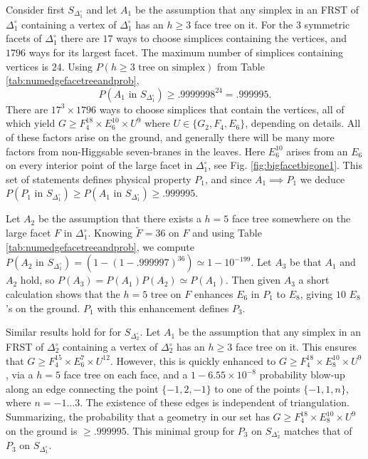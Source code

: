 \documentclass[aps,prl,twocolumn, superscriptaddress,groupedaddress,nofootinbib]{revtex4-1}
\newcommand{\sdoc}{S_{\Delta_1^\circ}}
\newcommand{\sdtc}{S_{\Delta_2^\circ}}
\newcommand{\doc}{{\Delta_1^\circ}}
\newcommand{\dtc}{{\Delta_2^\circ}}
\newcommand{\textin}{\,\, \text{in} \,\,}
\begin{document}
Consider first $\sdoc$ and let $A_1$ be the assumption that any simplex in an FRST 
of $\doc$ containing a vertex of $\doc$ has an $h\geq 3$ face tree on it. 
For the $3$ symmetric facets of $\doc$ there are $17$ ways to choose simplices
containing the vertices, and $1796$ ways for its largest facet. The maximum
number of simplices containing vertices is $24$. Using $P(h\geq 3 \,\, \text{tree on simplex})$ from Table \ref{tab:numedgefacetreeandprob},
\begin{equation}
P(A_1\textin\sdoc)\geq .9999998^{24}=.999995.
\end{equation}
There are $17^3\times1796$ ways to choose simplices that contain the vertices,
all of which yield $G\geq F_4^{18}\times E_6^{10}\times U^9$ where 
$U\in\{G_2,F_4,E_6\}$, depending on details. All of these factors arise on
the ground, and generally there will be many more factors from non-Higgsable seven-branes
in the leaves. Here $E_6^{10}$ arises from an $E_6$ on every interior point
of the large facet in $\doc$, see Fig. \ref{fig:bigfacetbigone1}. This set of
statements defines physical property $P_1$, and since $A_1\implies P_1$
we deduce $P(P_1\textin \sdoc)\geq P(A_1\textin \sdoc) \geq .999995$.

Let $A_2$ be the assumption that there exists a $h=5$ face tree somewhere
on the large facet $F$ in $\doc$. Knowing $\tilde F=36$ on $F$ and using
Table \ref{tab:numedgefacetreeandprob}, we compute $P(A_2 \textin \sdoc)=(1-(1-.999997)^{36})\simeq 1-10^{-199}.$ Let $A_3$ be that $A_1$ and $A_2$ hold, so 
$P(A_3)=P(A_1)P(A_2)\simeq P(A_1)$. Then given $A_3$ a short calculation shows 
that the  $h=5$ tree on $F$ 
enhances $E_6$ in $P_1$ to $E_8$, giving $10$ $E_8$'s on the ground. $P_1$ with this enhancement defines $P_3$. 

Similar results hold for for $\sdtc$. Let $A_1$ be the assumption that any simplex in an FRST 
of $\dtc$ containing a vertex of $\dtc$ has an $h\geq 3$ face tree on it. This ensures that $G\geq F_4^{15}\times E_6^{7}\times U^{12}$. However, this is quickly enhanced to  $G\geq F_4^{18}\times E_8^{10}\times U^9$, via a $h=5$ face tree on each face, and a $1-6.55\times 10^{-8}$ probability blow-up along an edge connecting the point $\{-1, 2, -1\}$ to one of the points $\{-1, 1, n\}$, where $n = -1\dots 3$. The existence of these edges is independent of triangulation. Summarizing, the probability that a geometry in our set has
$G\geq F_4^{18}\times E_8^{10}\times U^9$ on the ground is $\geq .999995$. This minimal group
for $P_3$ on $\sdtc$ matches that of $P_3$ on $\sdoc$.
\end{document}
